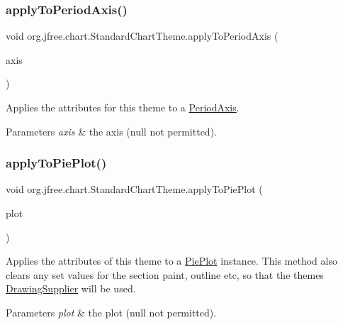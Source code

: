 \subsubsection{\texorpdfstring{apply\+To\+Period\+Axis()}{applyToPeriodAxis()}}
{\footnotesize\ttfamily void org.\+jfree.\+chart.\+Standard\+Chart\+Theme.\+apply\+To\+Period\+Axis (\begin{DoxyParamCaption}\item[{\mbox{\hyperlink{classorg_1_1jfree_1_1chart_1_1axis_1_1_period_axis}{Period\+Axis}}}]{axis }\end{DoxyParamCaption})\hspace{0.3cm}{\ttfamily [protected]}}

Applies the attributes for this theme to a \mbox{\hyperlink{}{Period\+Axis}}.


\begin{DoxyParams}{Parameters}
{\em axis} & the axis ({\ttfamily null} not permitted). \\
\hline
\end{DoxyParams}
\mbox{\label{classorg_1_1jfree_1_1chart_1_1_standard_chart_theme_adeb3bc92afb95352251c1af7cedccaa6}} 
\subsubsection{\texorpdfstring{apply\+To\+Pie\+Plot()}{applyToPiePlot()}}
{\footnotesize\ttfamily void org.\+jfree.\+chart.\+Standard\+Chart\+Theme.\+apply\+To\+Pie\+Plot (\begin{DoxyParamCaption}\item[{\mbox{\hyperlink{classorg_1_1jfree_1_1chart_1_1plot_1_1_pie_plot}{Pie\+Plot}}}]{plot }\end{DoxyParamCaption})\hspace{0.3cm}{\ttfamily [protected]}}

Applies the attributes of this theme to a \mbox{\hyperlink{}{Pie\+Plot}} instance. This method also clears any set values for the section paint, outline etc, so that the theme\textquotesingle{}s \mbox{\hyperlink{}{Drawing\+Supplier}} will be used.


\begin{DoxyParams}{Parameters}
{\em plot} & the plot ({\ttfamily null} not permitted). \\
\hline
\end{DoxyParams}
\mbox{\label{classorg_1_1jfree_1_1chart_1_1_standard_chart_theme_ad80532276c7939f2edd60c1c54447d49}} 
